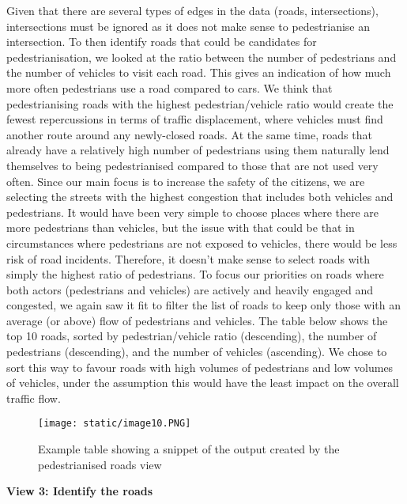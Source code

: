\documentclass[format=acmsmall, review=false, screen=true]{acmart}
\begin{document}
Given that there are several types of edges in the data (roads, intersections), intersections must be ignored as it does not make sense to pedestrianise an intersection. To then identify roads that could be candidates for pedestrianisation, we looked at the ratio between the number of pedestrians and the number of vehicles to visit each road. This gives an indication of how much more often pedestrians use a road compared to cars. We think that pedestrianising roads with the highest pedestrian/vehicle ratio would create the fewest repercussions in terms of traffic displacement, where vehicles must find another route around any newly-closed roads. At the same time, roads that already have a relatively high number of pedestrians using them naturally lend themselves to being pedestrianised compared to those that are not used very often. Since our main focus is to increase the safety of the citizens, we are selecting the streets with the highest congestion that includes both vehicles and pedestrians. It would have been very simple to choose places where there are more pedestrians than vehicles, but the issue with that could be that in circumstances where pedestrians are not exposed to vehicles, there would be less risk of road incidents. Therefore, it doesn't make sense to select roads with simply the highest ratio of pedestrians. To focus our priorities on roads where both actors (pedestrians and vehicles) are actively and heavily engaged and congested, we again saw it fit to filter the list of roads to keep only those with an average (or above) flow of pedestrians and vehicles. The table below shows the top 10 roads, sorted by pedestrian/vehicle ratio (descending), the number of pedestrians (descending), and the number of vehicles (ascending). We chose to sort this way to favour roads with high volumes of pedestrians and low volumes of vehicles, under the assumption this would have the least impact on the overall traffic flow.

\begin{figure}[H]
  \texttt{[image: static/image10.PNG]}
  \caption{Example table showing a snippet of the output created by the pedestrianised roads view}
  \label{fig:verticalpartitioning-diagram}
\end{figure}

\textbf{View 3: Identify the  roads}
\end{document}
